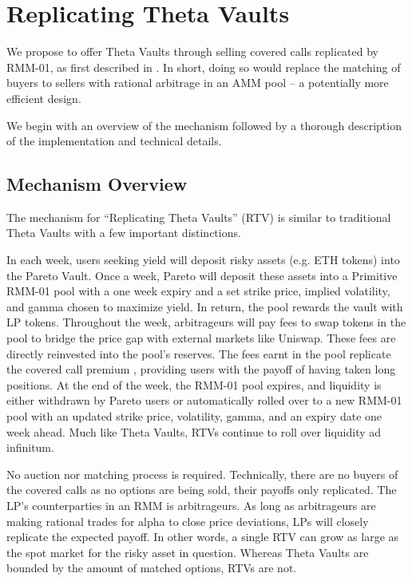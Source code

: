 \documentclass[hidelinks, 12pt]{article}
\begin{document}
\section{Replicating Theta Vaults}

We propose to offer Theta Vaults through selling covered calls replicated by RMM-01, as first described in \cite{sterrett2022replicating}. In short, doing so would replace the matching of buyers to sellers with rational arbitrage in an AMM pool -- a potentially more efficient design.

We begin with an overview of the mechanism followed by a thorough description of the implementation and technical details.

\subsection{Mechanism Overview}

The mechanism for ``Replicating Theta Vaults'' (RTV) is similar to traditional Theta Vaults with a few important distinctions.

In each week, users seeking yield will deposit risky assets (e.g. ETH tokens) into the Pareto Vault.
Once a week, Pareto will deposit these assets into a Primitive RMM-01 pool with a one week expiry and a set strike price, implied volatility, and gamma chosen to maximize yield. In return, the pool rewards the vault with LP tokens.
Throughout the week, arbitrageurs will pay fees to swap tokens in the pool to bridge the price gap with external markets like Uniswap.
These fees are directly reinvested into the pool's reserves.
The fees earnt in the pool replicate the covered call premium \cite{angeris2021replicating}, providing users with the payoff of having taken long positions.
At the end of the week, the RMM-01 pool expires, and liquidity is either withdrawn by Pareto users or automatically rolled over to a new RMM-01 pool with an updated strike price, volatility, gamma, and an expiry date one week ahead. Much like Theta Vaults, RTVs continue to roll over liquidity ad infinitum.

No auction nor matching process is required. Technically, there are no buyers of the covered calls as no options are being sold, their payoffs only replicated. The LP's counterparties in an RMM is arbitrageurs. As long as arbitrageurs are making rational trades for alpha to close price deviations, LPs will closely replicate the expected payoff. In other words, a single RTV can grow as large as the spot market for the risky asset in question. Whereas Theta Vaults are bounded by the amount of matched options, RTVs are not.
\end{document}
